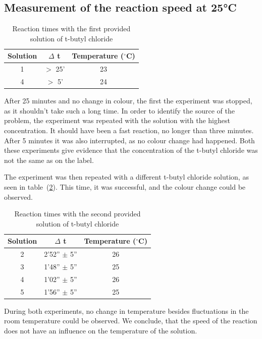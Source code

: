 \documentclass[12pt]{article}
\begin{document}
\subsection{Measurement of the reaction speed at 25°C}

\begin{table}[!ht]
    \centering
    \begin{tabular}{c|c|c}
        Solution & $\Delta$ t & Temperature ($^{\circ}$C) \\ \hline
        1 & $>$ 25' & 23 \\
        4 & $>$ 5' & 24
    \end{tabular}
    \caption{Reaction times with the first provided solution of t-butyl chloride}
    \label{tab:results1}
\end{table}

\noindent After 25 minutes and no change in colour, the first the experiment was stopped, as it shouldn't take such a long time. In order to identify the source of the problem, the experiment was repeated with the solution with the highest concentration. It should have been a fast reaction, no longer than three minutes. After 5 minutes it was also interrupted, as no colour change had happened. Both these experiments give evidence that the concentration of the t-butyl chloride was not the same as on the label. 

\noindent The experiment was then repeated with a different t-butyl chloride solution, as seen in table~(\ref{tab:results2}). This time, it was successful, and the colour change could be observed.

\begin{table}[!ht]
    \centering
    \begin{tabular}{c|c|c}
        Solution & $\Delta$ t  & Temperature ($^{\circ}$C) \\ \hline
        2 & 2'52'' $\pm$ 5'' & 26 \\
        3 & 1'48'' $\pm$ 5'' & 25 \\
        4 & 1'02'' $\pm$ 5'' & 26 \\
        5 & 1'56'' $\pm$ 5'' & 25
    \end{tabular}
    \caption{Reaction times with the second provided solution of t-butyl chloride}
    \label{tab:results2}
\end{table}
\FloatBarrier

\noindent During both experiments, no change in temperature besides fluctuations in the room temperature could be observed. We conclude, that the speed of the reaction does not have an influence on the temperature of the solution.
\end{document}
